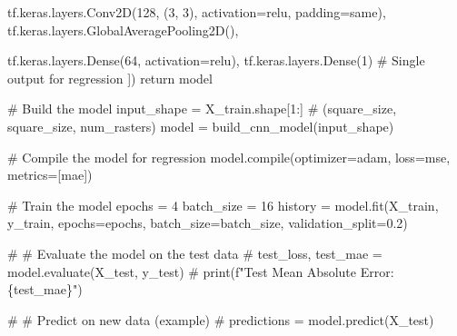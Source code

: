 \documentclass[
  letterpaper,
]{article}
\newenvironment{Shaded}{\begin{snugshade}}{\end{snugshade}}
\newcommand{\BuiltInTok}[1]{\textcolor[rgb]{0.00,0.23,0.31}{#1}}
\newcommand{\CommentTok}[1]{\textcolor[rgb]{0.37,0.37,0.37}{#1}}
\newcommand{\ControlFlowTok}[1]{\textcolor[rgb]{0.00,0.23,0.31}{#1}}
\newcommand{\DecValTok}[1]{\textcolor[rgb]{0.68,0.00,0.00}{#1}}
\newcommand{\FloatTok}[1]{\textcolor[rgb]{0.68,0.00,0.00}{#1}}
\newcommand{\NormalTok}[1]{\textcolor[rgb]{0.00,0.23,0.31}{#1}}
\newcommand{\OperatorTok}[1]{\textcolor[rgb]{0.37,0.37,0.37}{#1}}
\newcommand{\StringTok}[1]{\textcolor[rgb]{0.13,0.47,0.30}{#1}}
\begin{document}
\begin{Shaded}
\begin{Highlighting}[]
\NormalTok{        tf.keras.layers.Conv2D(}\DecValTok{128}\NormalTok{, (}\DecValTok{3}\NormalTok{, }\DecValTok{3}\NormalTok{), activation}\OperatorTok{=}\StringTok{\textquotesingle{}relu\textquotesingle{}}\NormalTok{, padding}\OperatorTok{=}\StringTok{\textquotesingle{}same\textquotesingle{}}\NormalTok{),}
\NormalTok{        tf.keras.layers.GlobalAveragePooling2D(),}
        
\NormalTok{        tf.keras.layers.Dense(}\DecValTok{64}\NormalTok{, activation}\OperatorTok{=}\StringTok{\textquotesingle{}relu\textquotesingle{}}\NormalTok{),}
\NormalTok{        tf.keras.layers.Dense(}\DecValTok{1}\NormalTok{)  }\CommentTok{\# Single output for regression}
\NormalTok{    ])}
    \ControlFlowTok{return}\NormalTok{ model}

\CommentTok{\# Build the model}
\NormalTok{input\_shape }\OperatorTok{=}\NormalTok{ X\_train.shape[}\DecValTok{1}\NormalTok{:]  }\CommentTok{\# (square\_size, square\_size, num\_rasters)}
\NormalTok{model }\OperatorTok{=}\NormalTok{ build\_cnn\_model(input\_shape)}

\CommentTok{\# Compile the model for regression}
\NormalTok{model.}\BuiltInTok{compile}\NormalTok{(optimizer}\OperatorTok{=}\StringTok{\textquotesingle{}adam\textquotesingle{}}\NormalTok{, loss}\OperatorTok{=}\StringTok{\textquotesingle{}mse\textquotesingle{}}\NormalTok{, metrics}\OperatorTok{=}\NormalTok{[}\StringTok{\textquotesingle{}mae\textquotesingle{}}\NormalTok{])}

\CommentTok{\# Train the model}
\NormalTok{epochs }\OperatorTok{=} \DecValTok{4}
\NormalTok{batch\_size }\OperatorTok{=} \DecValTok{16}
\NormalTok{history }\OperatorTok{=}\NormalTok{ model.fit(X\_train, y\_train, epochs}\OperatorTok{=}\NormalTok{epochs, batch\_size}\OperatorTok{=}\NormalTok{batch\_size, validation\_split}\OperatorTok{=}\FloatTok{0.2}\NormalTok{)}

\CommentTok{\# \# Evaluate the model on the test data}
\CommentTok{\# test\_loss, test\_mae = model.evaluate(X\_test, y\_test)}
\CommentTok{\# print(f"Test Mean Absolute Error: \{test\_mae\}")}

\CommentTok{\# \# Predict on new data (example)}
\CommentTok{\# predictions = model.predict(X\_test)}
\end{Highlighting}
\end{Shaded}
\end{document}

